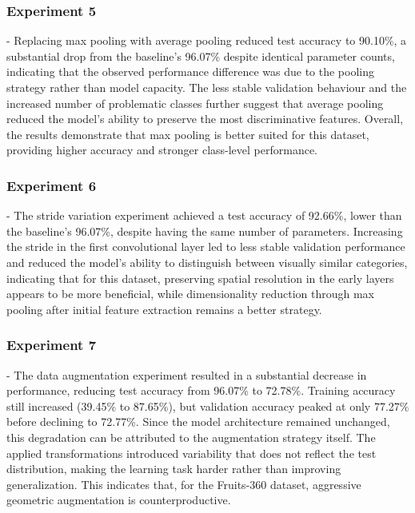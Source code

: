 \documentclass[conference]{IEEEtran}
\begin{document}
\subsubsection{Experiment 5} - Replacing max pooling with average pooling reduced test accuracy to 90.10\%, a substantial drop from the baseline's 96.07\% despite identical parameter counts, indicating that the observed performance difference was due to the pooling strategy rather than model capacity. The less stable validation behaviour and the increased number of problematic classes further suggest that average pooling reduced the model's ability to preserve the most discriminative features. Overall, the results demonstrate that max pooling is better suited for this dataset, providing higher accuracy and stronger class-level performance.

\subsubsection{Experiment 6} - The stride variation experiment achieved a test accuracy of 92.66\%, lower than the baseline's 96.07\%, despite having the same number of parameters. Increasing the stride in the first convolutional layer led to less stable validation performance and reduced the model's ability to distinguish between visually similar categories, indicating that for this dataset, preserving spatial resolution in the early layers appears to be more beneficial, while dimensionality reduction through max pooling after initial feature extraction remains a better strategy. 

\subsubsection{Experiment 7} - The data augmentation experiment resulted in a substantial decrease in performance, reducing test accuracy from 96.07\% to 72.78\%. Training accuracy still increased (39.45\% to 87.65\%), but validation accuracy peaked at only 77.27\% before declining to 72.77\%. Since the model architecture remained unchanged, this degradation can be attributed to the augmentation strategy itself. The applied transformations introduced variability that does not reflect the test distribution, making the learning task harder rather than improving generalization. This indicates that, for the Fruits-360 dataset, aggressive geometric augmentation is counterproductive.
\end{document}

